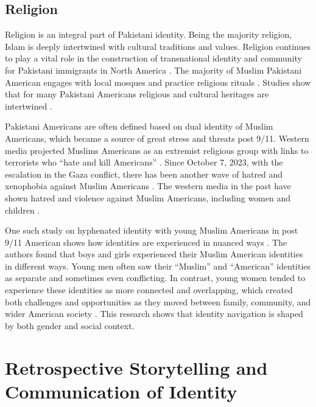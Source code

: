 \subsection{Religion}

Religion is an integral part of Pakistani identity. Being the majority religion, Islam is deeply intertwined with cultural traditions and values. Religion continues to play a vital role in the construction of transnational identity and community for Pakistani immigrants in North America \citep{afzalPakistaniFamilies2021}. The majority of Muslim Pakistani American engages with local mosques and practice religious rituals \citep{ghaniPakistaniMigrantsUnited2016}. Studies show that for many Pakistani Americans religious and cultural heritages are intertwined  \citep{bashirUnderstandingContributingFactors2018}. 

Pakistani Americans are often defined based on dual identity of Muslim Americans, which became a source of great stress and threats post 9/11. Western media projected Muslims Americans as an extremist religious group with links to terrorists who ``hate and kill Americans'' \citep{bilalPortrayalPakistanSilver2021}. Since October 7, 2023, with the escalation in the Gaza conflict, there has been another wave of hatred and xenophobia against Muslim Americans \citep{yancey-braggAntiMuslimDiscriminationReached2025, deroseAntiMuslimBiasReports2024, baileyCAIRReceivedUnprecedented2023}. The western media in the past have shown hatred and violence against Muslim Americans, including women and children \citep{deroseAntiMuslimBiasReports2024, singhAntiMuslimIncidentsJump2024}.

One such study on hyphenated identity with young Muslim Americans in post 9/11 American shows how identities are experienced in nuanced ways \citep{chaudharyTaleTwoGenerations2024, sirinHyphenatedSelvesMuslim2007}. The authors found that boys and girls experienced their Muslim American identities in different ways. Young men often saw their ``Muslim'' and ``American'' identities as separate and sometimes even conflicting. In contrast, young women tended to experience these identities as more connected and overlapping, which created both challenges and opportunities as they moved between family, community, and wider American society \citep{sirinHyphenatedSelvesMuslim2007}. This research shows that identity navigation is shaped by both gender and social context.

\section{Retrospective Storytelling and Communication of Identity}

